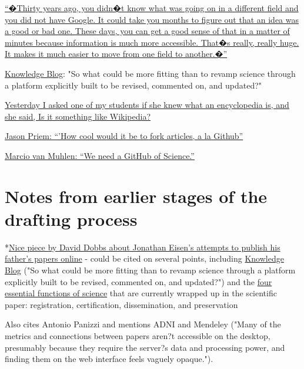 \documentclass[final,authoryear,3p]{elsarticle-open-drafting}
\begin{document}
\href{http://blogs.discovermagazine.com/notrocketscience/2011/06/08/the-renaissance-man-how-to-become-a-scientist-over-and-over-again/}{``�Thirty years ago, you didn�t know what was going on in a different field and you did not have Google. It could take you months to figure out that an idea was a good or bad one. These days, you can get a good sense of that in a matter of minutes because information is much more accessible. That�s really, really huge. It makes it much easier to move from one field to another.�''}

\href{http://knowledgeblog.org/}{Knowledge Blog}: "So what could be more fitting than to revamp science through a platform explicitly built to be revised, commented on, and updated?"

\href{http://twitter.com/#!/egonwillighagen/statuses/39097468700336128}{Yesterday I asked one of my students if she knew what an encyclopedia is, and she said, Is it something like Wikipedia?}

\href{http://friendfeed.com/cameronneylon/c476db70/imo-this-is-possibly-single-most-useful-thing-we}{Jason Priem: ``'How cool would it be to fork articles, a la Github''}

\href{http://marciovm.com/i-want-a-github-of-science}{Marcio van Muhlen: ``We need a GitHub of Science.''}

\section{Notes from earlier stages of the drafting process}



*\href{http://www.wired.com/wiredscience/2011/05/free-science-one-paper-at-a-time-2/all/1}{Nice piece by David Dobbs about Jonathan Eisen's attempts to publish his father's papers online} - could be cited on several points, including \href{http://knowledgeblog.org/}{Knowledge Blog} ("So what could be more fitting than to revamp science through a platform explicitly built to be revised, commented on, and updated?") and the \href{http://www.ariadne.ac.uk/issue7/fytton/}{four essential functions of science} that are currently wrapped up in the scientific paper: registration, certification, dissemination, and preservation

Also cites Antonio Panizzi and mentions ADNI and Mendeley ("Many of the metrics and connections between papers aren?t accessible on the desktop, presumably because they require the server?s data and processing power, and finding them on the web interface feels vaguely opaque.").
\end{document}
